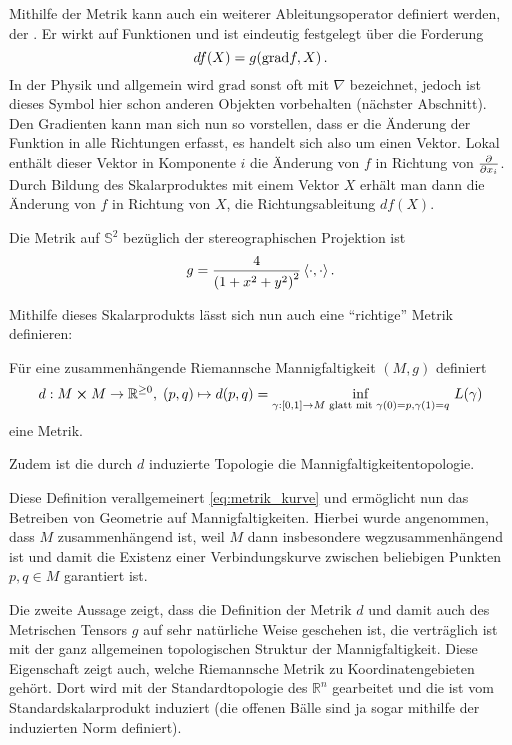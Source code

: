 \begin{bsp}[Gradient]
Mithilfe der Metrik kann auch ein weiterer Ableitungsoperator definiert werden, der . Er wirkt auf Funktionen und ist eindeutig festgelegt über die Forderung
\begin{equation}
df(X) = g\qty(\text{grad} f, X) \, .
\end{equation}
In der Physik und allgemein wird $\text{grad}$ sonst oft mit $\nabla$ bezeichnet, jedoch ist dieses Symbol hier schon anderen Objekten vorbehalten (nächster Abschnitt). Den Gradienten kann man sich nun so vorstellen, dass er die Änderung der Funktion in alle Richtungen erfasst, es handelt sich also um einen Vektor. Lokal enthält dieser Vektor in Komponente $i$ die Änderung von $f$ in Richtung von $\pdv{x_i}$. Durch Bildung des Skalarproduktes mit einem Vektor $X$ erhält man dann die Änderung von $f$ in Richtung von $X$, die Richtungsableitung $df(X)$.
\end{bsp}


\begin{bsp}[Sphäre]
Die Metrik auf $\mathbb{S}^2$ bezüglich der stereographischen Projektion ist
\begin{equation}
g = \frac{4}{\qty(1 + x^2 + y^2)^2} \, \langle \cdot, \cdot \rangle \, .
\end{equation}
\end{bsp}


Mithilfe dieses Skalarprodukts lässt sich nun auch eine \enquote{richtige} Metrik definieren:
\begin{satz}[Abstand]
Für eine zusammenhängende Riemannsche Mannigfaltigkeit $(M, g)$ definiert
\begin{equation}\label{eq:distance_curve}
d: M \cross M \rightarrow \mathbb{R}^{\geq 0}, \; (p, q) \mapsto d(p, q) = \inf_{\gamma: [0, 1] \rightarrow M \text{ glatt mit } \gamma(0) = p, \gamma(1) = q} \, L(\gamma)
\end{equation}
eine Metrik.

Zudem ist die durch $d$ induzierte Topologie die Mannigfaltigkeitentopologie.
\end{satz}
Diese Definition verallgemeinert \eqref{eq:metrik_kurve} und ermöglicht nun das Betreiben von Geometrie auf Mannigfaltigkeiten. Hierbei wurde angenommen, dass $M$ zusammenhängend ist, weil $M$ dann insbesondere wegzusammenhängend ist und damit die Existenz einer Verbindungskurve zwischen beliebigen Punkten $p, q \in M$ garantiert ist.

Die zweite Aussage zeigt, dass die Definition der Metrik $d$ und damit auch des Metrischen Tensors $g$ auf sehr natürliche Weise geschehen ist, die verträglich ist mit der ganz allgemeinen topologischen Struktur der Mannigfaltigkeit. Diese Eigenschaft zeigt auch, welche Riemannsche Metrik zu Koordinatengebieten gehört. Dort wird mit der Standardtopologie des $\mathbb{R}^n$ gearbeitet und die ist vom Standardskalarprodukt induziert (die offenen Bälle sind ja sogar mithilfe der induzierten Norm definiert).\\


